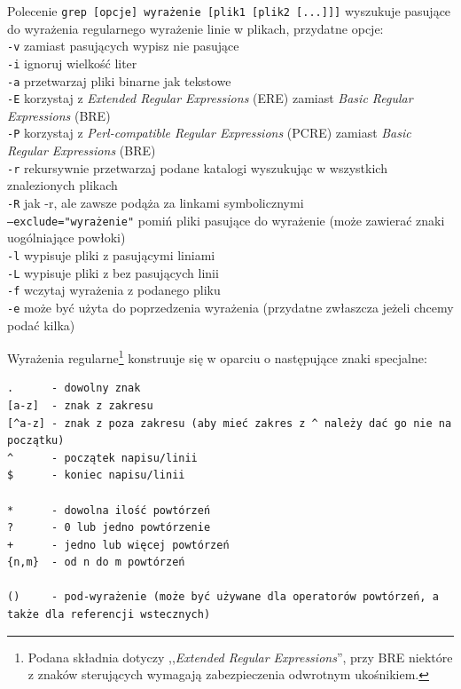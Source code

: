 Polecenie
\texttt{grep [opcje] wyrażenie [plik1 [plik2 [...]]]}
wyszukuje pasujące do wyrażenia regularnego wyrażenie linie w plikach, przydatne opcje:\\
	\texttt{-v} zamiast pasujących wypisz nie pasujące\\
	\texttt{-i} ignoruj wielkość liter\\
	\texttt{-a} przetwarzaj pliki binarne jak tekstowe\\
	\texttt{-E} korzystaj z \emph{Extended Regular Expressions} (ERE) zamiast \emph{Basic Regular Expressions} (BRE)\vspace{6pt}\\
	\texttt{-P} korzystaj z \emph{Perl-compatible Regular Expressions} (PCRE) zamiast \emph{Basic Regular Expressions} (BRE)\vspace{6pt}\\
	\texttt{-r} rekursywnie przetwarzaj podane katalogi wyszukując w wszystkich znalezionych plikach\\
	\texttt{-R} jak -r, ale zawsze podąża za linkami symbolicznymi\\
	\texttt{--exclude="wyrażenie"} pomiń pliki pasujące do wyrażenie (może zawierać znaki uogólniające powłoki)\vspace{6pt}\\
	\texttt{-l} wypisuje pliki z pasującymi liniami\\
	\texttt{-L} wypisuje pliki z bez pasujących linii\\
	\texttt{-f} wczytaj wyrażenia z podanego pliku\\
	\texttt{-e} może być użyta do poprzedzenia wyrażenia (przydatne zwłaszcza jeżeli chcemy podać kilka)

\vspace{13pt}\noindent Wyrażenia regularne\footnote{
	Podana składnia dotyczy ,,\emph{Extended Regular Expressions}'', przy BRE niektóre z znaków sterujących wymagają zabezpieczenia odwrotnym ukośnikiem.
} konstruuje się w oparciu o następujące znaki specjalne:
\vspace{-6pt}\begin{Verbatim}
.      - dowolny znak
[a-z]  - znak z zakresu
[^a-z] - znak z poza zakresu (aby mieć zakres z ^ należy dać go nie na początku)
^      - początek napisu/linii
$      - koniec napisu/linii

*      - dowolna ilość powtórzeń
?      - 0 lub jedno powtórzenie
+      - jedno lub więcej powtórzeń
{n,m}  - od n do m powtórzeń

()     - pod-wyrażenie (może być używane dla operatorów powtórzeń, a także dla referencji wstecznych)
\end{Verbatim}

